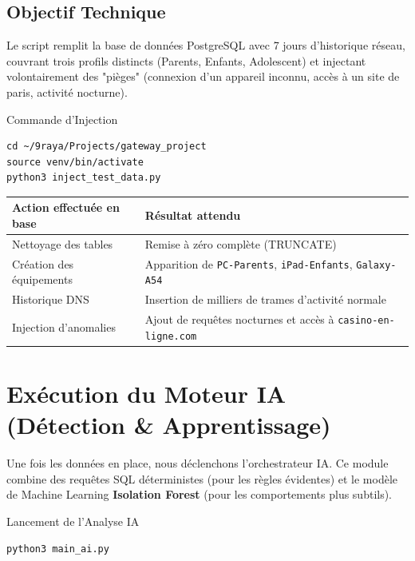 \documentclass[11pt,a4paper]{article}
\begin{document}
\subsection{Objectif Technique}
Le script remplit la base de données PostgreSQL avec 7 jours d'historique réseau, couvrant trois profils distincts (Parents, Enfants, Adolescent) et injectant volontairement des "pièges" (connexion d'un appareil inconnu, accès à un site de paris, activité nocturne).

\begin{stepcadre}{Commande d'Injection}
\begin{lstlisting}[language=BashShell]
cd ~/9raya/Projects/gateway_project
source venv/bin/activate
python3 inject_test_data.py
\end{lstlisting}
\end{stepcadre}

\begin{center}
\small
\begin{tabularx}{0.9\textwidth}{|l|X|}
\hline
\rowcolor{lightblue}\textbf{Action effectuée en base} & \textbf{Résultat attendu} \\ \hline
Nettoyage des tables & Remise à zéro complète (TRUNCATE) \\ \hline
Création des équipements & Apparition de \texttt{PC-Parents}, \texttt{iPad-Enfants}, \texttt{Galaxy-A54} \\ \hline
Historique DNS & Insertion de milliers de trames d'activité normale \\ \hline
\rowcolor{lightred!50} Injection d'anomalies & Ajout de requêtes nocturnes et accès à \texttt{casino-en-ligne.com} \\ \hline
\end{tabularx}
\end{center}

\section{Exécution du Moteur IA (Détection \& Apprentissage)}

Une fois les données en place, nous déclenchons l'orchestrateur IA. Ce module combine des requêtes SQL déterministes (pour les règles évidentes) et le modèle de Machine Learning \textbf{Isolation Forest} (pour les comportements plus subtils).

\begin{stepcadre}{Lancement de l'Analyse IA}
\begin{lstlisting}[language=BashShell]
python3 main_ai.py
\end{lstlisting}
\end{stepcadre}
\end{document}
